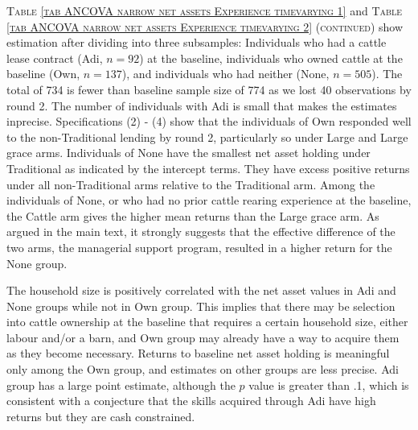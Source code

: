 \textsc{\normalsize Table \ref{tab ANCOVA narrow net assets Experience timevarying 1}} and \textsc{\normalsize Table \ref{tab ANCOVA narrow net assets Experience timevarying 2} (continued)} show estimation after dividing into three subsamples: Individuals who had a cattle lease contract (\textsf{Adi}, $n=92$) at the baseline, individuals who owned cattle at the baseline (\textsf{Own}, $n=137$), and individuals who had neither (\textsf{None}, $n=505$). The total of 734 is fewer than baseline sample size of 774 as we lost 40 observations by round 2. The number of individuals with \textsf{Adi} is small that makes the estimates inprecise. Specifications (2) - (4) show that the individuals of \textsf{Own} responded well to the non-\textsf{Traditional} lending by round 2, particularly so under \textsf{Large} and \textsf{Large grace} arms. Individuals of \textsf{None} have the smallest net asset holding under \textsf{Traditional} as indicated by the intercept terms. They have excess positive returns under all non-\textsf{Traditional} arms relative to the \textsf{Traditional} arm. Among the individuals of \textsf{None}, or who had no prior cattle rearing experience at the baseline, the \textsf{Cattle} arm gives the higher mean returns than the \textsf{Large grace} arm. As argued in the main text, it strongly suggests that the effective difference of the two arms, the managerial support program, resulted in a higher return for the \textsf{None} group.

The household size is positively correlated with the net asset values in \textsf{Adi} and \textsf{None} groups while not in \textsf{Own} group. This implies that there may be selection into cattle ownership at the baseline that requires a certain household size, either labour and/or a barn, and \textsf{Own} group may already have a way to acquire them as they become necessary. Returns to baseline net asset holding is meaningful only among the \textsf{Own} group, and estimates on other groups are less precise. \textsf{Adi} group has a large point estimate, although the $p$ value is greater than .1, which is consistent with a conjecture that the skills acquired through Adi have high returns but they are cash constrained.


